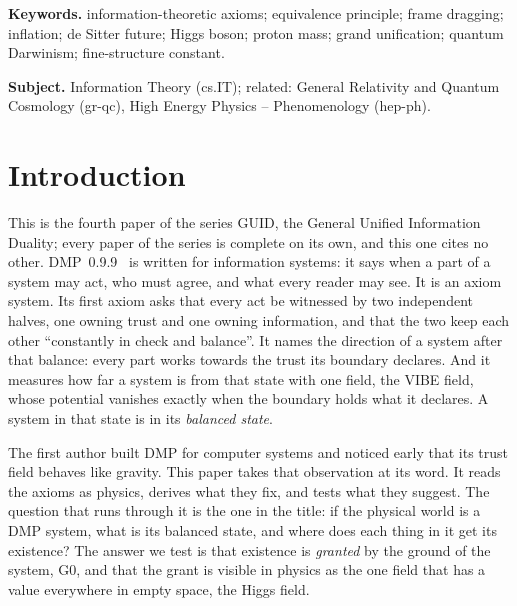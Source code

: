 \documentclass[11pt,a4paper]{article}
\theoremstyle{definition}
\begin{document}
\noindent\textbf{Keywords.} information-theoretic axioms; equivalence principle; frame dragging; inflation; de Sitter future; Higgs
boson; proton mass; grand unification; quantum Darwinism; fine-structure constant.

\noindent\textbf{Subject.} Information Theory (cs.IT); related: General Relativity and Quantum Cosmology (gr-qc), High Energy Physics --
Phenomenology (hep-ph).

\section{Introduction}\label{sec:intro}

This is the fourth paper of the series GUID, the General Unified Information Duality; every paper of the series is complete on its own,
and this one cites no other. DMP~0.9.9~\cite{dmp} is written for information systems: it says when a part of a system may act, who must agree, and what every reader may
see. It is an axiom system. Its first axiom asks that every act be witnessed by two independent halves, one owning trust and one owning
information, and that the two keep each other ``constantly in check and balance''. It names the direction of a system after that balance:
every part works towards the trust its boundary declares. And it measures how far a system is from that state with one field, the VIBE
field, whose potential vanishes exactly when the boundary holds what it declares. A system in that state is in its \emph{balanced state}.

The first author built DMP for computer systems and noticed early that its trust field behaves like gravity. This paper takes that
observation at its word. It reads the axioms as physics, derives what they fix, and tests what they suggest. The question that runs through
it is the one in the title: if the physical world is a DMP system, what is its balanced state, and where does each thing in it get its
existence? The answer we test is that existence is \emph{granted} by the ground of the system, G0, and that the grant is visible in physics
as the one field that has a value everywhere in empty space, the Higgs field.
\end{document}

